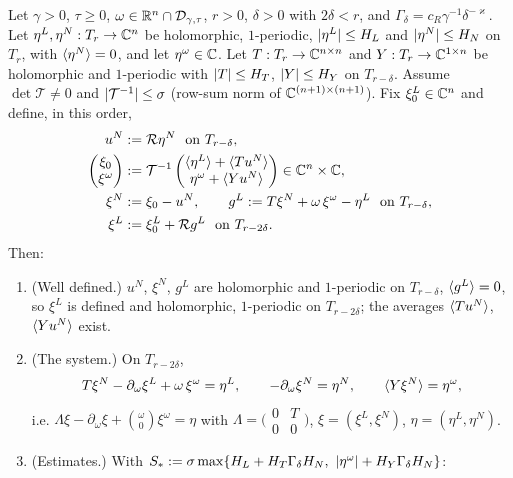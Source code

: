 \begin{lemma}\label{bpI:p1:border-solve}
Let $\gamma>0$, $\tau\ge0$, $\omega\in\mathbb{R}^n\cap\mathcal{D}_{\gamma,\tau}$, $r>0$, $\delta>0$ with $2\delta<r$, and $\Gamma_\delta=c_R\gamma^{-1}\delta^{-\varkappa}$.
Let $\eta^L,\eta^N:T_r\to\mathbb{C}^n$ be holomorphic, $1$-periodic, $\lvert \eta^L\rvert\le H_L$ and $\lvert \eta^N\rvert\le H_N$ on $T_r$,
with $\langle \eta^N\rangle=0$, and let $\eta^\omega\in\mathbb{C}$. Let $T:T_r\to\mathbb{C}^{n\times n}$ and $Y:T_r\to\mathbb{C}^{1\times n}$ be holomorphic and $1$-periodic with
$\lvert T\rvert\le H_T$, $\lvert Y\rvert\le H_Y$ on $T_{r-\delta}$. Assume $\det\mathcal T\ne0$ and $\lvert \mathcal T^{-1}\rvert\le\sigma$ (row-sum
norm of $\mathbb{C}^{(n+1)\times(n+1)}$). Fix $\xi^L_0\in\mathbb{C}^n$ and define, in this order,
\begin{align*}
u^N&:=\mathcal R\eta^N\ \text{ on }T_{r-\delta},\\
\begin{pmatrix}\xi_0\\ \xi^\omega\end{pmatrix}&:=\mathcal T^{-1}\begin{pmatrix}\avg{\eta^L}+\avg{Tu^N}\\ \eta^\omega+\avg{Yu^N}\end{pmatrix}\in\C^{n}\times\C,\\
\xi^N&:=\xi_0-u^N,\qquad g^L:=T\xi^N+\omega\,\xi^\omega-\eta^L\ \text{ on }T_{r-\delta},\\
\xi^L&:=\xi^L_0+\mathcal Rg^L\ \text{ on }T_{r-2\delta}.
\end{align*}
Then:
\begin{enumerate}[label=(\alph*)]
\item (Well defined.) $u^N$, $\xi^N$, $g^L$ are holomorphic and $1$-periodic on $T_{r-\delta}$, $\langle g^L\rangle=0$, so $\xi^L$ is defined
  and holomorphic, $1$-periodic on $T_{r-2\delta}$; the averages $\langle Tu^N\rangle$, $\langle Yu^N\rangle$ exist.
\item (The system.) On $T_{r-2\delta}$,
  \[
  T\xi^N-\partial_\omega\xi^L+\omega\,\xi^\omega=\eta^L,\qquad-\partial_\omega\xi^N=\eta^N,\qquad\langle Y\xi^N\rangle=\eta^\omega,
  \]
  i.e. $\Lambda\xi-\partial_\omega\xi+\binom{\omega}{0}\xi^\omega=\eta$ with $\Lambda=\bigl(\begin{smallmatrix}0&T\\0&0\end{smallmatrix}\bigr)$,
  $\xi=(\xi^L,\xi^N)$, $\eta=(\eta^L,\eta^N)$.
\item (Estimates.) With $S_*:=\sigma\max\{H_L+H_T\Gamma_\delta H_N,\ \abs{\eta^\omega}+H_Y\Gamma_\delta H_N\}$:

\end{enumerate}
\end{lemma}
